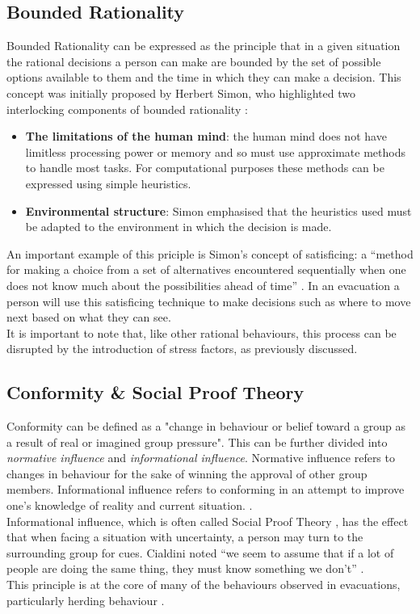 \subsection{Bounded Rationality}
\label{subsec:boundedRationality}
Bounded Rationality can be expressed as the principle that in a given situation the rational decisions a person can make are bounded by the set of possible options available to them and the time in which they can make a decision. This concept was initially proposed by Herbert Simon, who highlighted two interlocking components of bounded rationality \cite{BoundedRationalityDefinition}:
\begin{itemize}
  \item{\textbf{The limitations of the human mind}: the human mind does not have limitless processing power or memory and so must use approximate methods to handle most tasks. For computational purposes these methods can be expressed using simple heuristics.}
  \item{\textbf{Environmental structure}: Simon emphasised that the heuristics used must be adapted to the environment in which the decision is made.}
\end{itemize}
An important example of this priciple is Simon's concept of satisficing: a ``method for making a choice from a set of alternatives encountered sequentially when one does not know much about the possibilities ahead of time'' \cite{BoundedRationalityDefinition}. In an evacuation a person will use this satisficing technique to make decisions such as where to move next based on what they can see.\\
It is important to note that, like other rational behaviours, this process can be disrupted by the introduction of stress factors, as previously discussed.

\subsection{Conformity \& Social Proof Theory}
\label{subsec:socialProof}
Conformity can be defined as a "change in behaviour or belief toward a group as a result of real or imagined group pressure". This can be further divided into \emph{normative influence} and \emph{informational influence}. Normative influence refers to changes in behaviour for the sake of winning the approval of other group members. Informational influence refers to conforming in an attempt to improve one's knowledge of reality and current situation. \cite{HandbookOfPsychology5}.\\
Informational influence, which is often called Social Proof Theory \cite{SocialProofWiki},  has the effect that when facing a situation with uncertainty, a person may turn to the surrounding group for cues. Cialdini noted ``we seem to assume that if a lot of people are doing the same thing, they must know something we don't'' \cite{PanMASSEgressThesis}.\\
This principle is at the core of many of the behaviours observed in evacuations, particularly herding behaviour \cite{PanMASSEgressThesis,MultiAgentFramework}.

